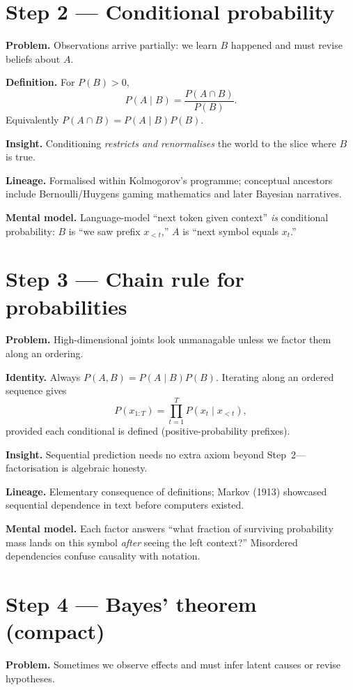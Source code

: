 \section*{Step 2 --- Conditional probability}
\textbf{Problem.} Observations arrive partially: we learn $B$ happened and must revise beliefs about $A$.

\textbf{Definition.} For $P(B)>0$,
\[
  P(A\mid B)=\frac{P(A\cap B)}{P(B)}.
\]
Equivalently $P(A\cap B)=P(A\mid B)P(B)$.

\textbf{Insight.} Conditioning \emph{restricts and renormalises} the world to the slice where $B$ is true.

\textbf{Lineage.} Formalised within Kolmogorov's programme; conceptual ancestors include Bernoulli/Huygens gaming mathematics and later Bayesian narratives.

\textbf{Mental model.} Language-model ``next token given context'' \emph{is} conditional probability: $B$ is ``we saw prefix $x_{<t}$,'' $A$ is ``next symbol equals $x_t$.''

\section*{Step 3 --- Chain rule for probabilities}
\textbf{Problem.} High-dimensional joints look unmanagable unless we factor them along an ordering.

\textbf{Identity.} Always $P(A,B)=P(A\mid B)P(B)$. Iterating along an ordered sequence gives
\[
  P(x_{1:T})=\prod_{t=1}^{T} P(x_t\mid x_{<t}),
\]
provided each conditional is defined (positive-probability prefixes).

\textbf{Insight.} Sequential prediction needs no extra axiom beyond Step~2---factorisation is algebraic honesty.

\textbf{Lineage.} Elementary consequence of definitions; Markov (1913) showcased sequential dependence in text before computers existed.

\textbf{Mental model.} Each factor answers ``what fraction of surviving probability mass lands on this symbol \emph{after} seeing the left context?'' Misordered dependencies confuse causality with notation.

\section*{Step 4 --- Bayes' theorem (compact)}
\textbf{Problem.} Sometimes we observe effects and must infer latent causes or revise hypotheses.

